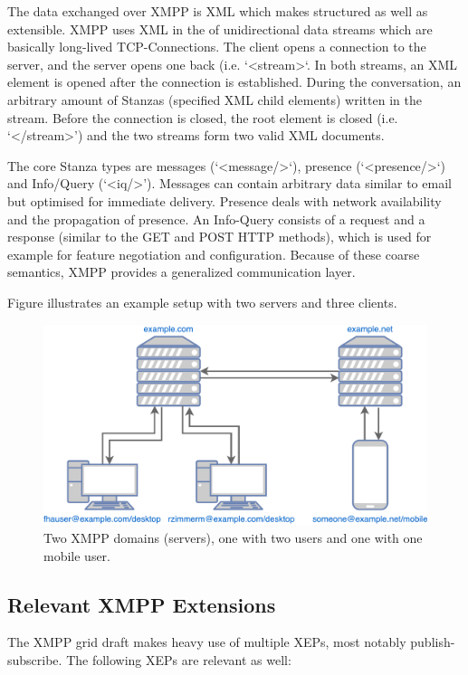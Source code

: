 The data exchanged over XMPP is XML which makes structured as well as extensible. XMPP uses XML in the of unidirectional data streams which are basically long-lived TCP-Connections. The client opens a connection to the server, and the server opens one back (i.e. `<stream>`. In both streams, an XML element is opened after the connection is established. During the conversation, an arbitrary amount of Stanzas (specified XML child elements) written in the stream. Before the connection is closed, the root element is closed (i.e. `</stream>') and the two streams form two valid XML documents.\cite{rfc6120}\cite{professional-xmpp}

The core Stanza types are messages (`<message/>`), presence (`<presence/>`) and Info/Query (`<iq/>'). Messages can contain arbitrary data similar to email but optimised for immediate delivery. Presence deals with network availability and the propagation of presence. An Info-Query consists of a request and a response (similar to the GET and POST HTTP methods), which is used for example for feature negotiation and configuration. Because of these coarse semantics, XMPP provides a generalized communication layer. \cite{rfc6120} \cite{ieee-xplore-stream-xml-xmpp}

Figure  illustrates an example setup with two servers and three clients.

\begin{figure}[h]
	\centering
	\includegraphics[width=0.8\linewidth]{resources/xmpp_overview.pdf}
	\caption{Two XMPP domains (servers), one with two users and one with one mobile user.}
	\label{fig:xmpp-overview}
\end{figure}

\subsection{Relevant XMPP Extensions}

The XMPP grid draft\cite{ietf-mile-xmpp-grid-05} makes heavy use of multiple XEPs, most notably publish-subscribe. The following XEPs are relevant as well:

